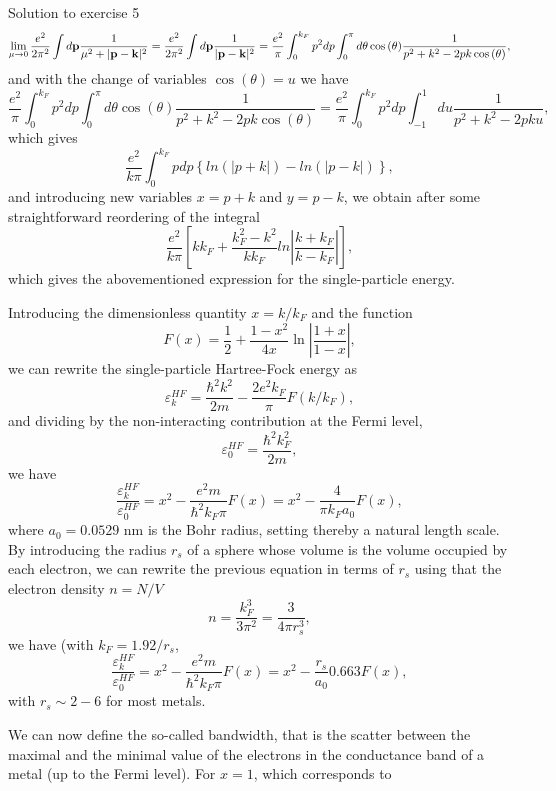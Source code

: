 \documentclass{beamer}
\begin{document}
\begin{frame}
\begin{block}{Solution to exercise 5 }
\[
\lim_{\mu \to 0}\frac{e^{2}}{ 2\pi^2}  \int d{\bf p}\frac{1}{\mu^2+\vert {\bf p}-{\bf k}\vert^2}=\frac{e^{2}}{ 2\pi^2}  \int d{\bf p}\frac{1}{\vert {\bf p}-{\bf k}\vert^2}=\frac{e^{2}}{\pi}  \int_0^{k_F} p^2dp\int_0^{\pi} d\theta\cos{(\theta)}\frac{1}{p^2+k^2-2pk\cos{(\theta)}},
\]
and with the change of variables $\cos{(\theta)}=u$ we have 
\[
\frac{e^{2}}{\pi}  \int_0^{k_F} p^2dp\int_{0}^{\pi} d\theta\cos{(\theta)}\frac{1}{p^2+k^2-2pk\cos{(\theta)}}=\frac{e^{2}}{\pi}  \int_0^{k_F} p^2dp\int_{-1}^{1} du\frac{1}{p^2+k^2-2pku},
\]
which gives
\[
\frac{e^{2}}{k\pi}  \int_0^{k_F} pdp\left\{ln(\vert p+k\vert)-ln(\vert p-k\vert)\right\},
\]
and introducing new variables $x=p+k$ and $y=p-k$, we obtain after some straightforward reordering of the integral
\[
\frac{e^{2}}{k\pi}\left[
kk_F+\frac{k_{F}^{2}-k^{2}}{kk_{F}}ln\left\vert\frac{k+k_{F}}
{k-k_{F}}\right\vert
\right],
\]
which gives the abovementioned expression for the single-particle energy.

Introducing the dimensionless quantity $x=k/k_F$ and the function
\[
F(x) = \frac{1}{2}+\frac{1-x^2}{4x}\ln{\left\vert \frac{1+x}{1-x}\right\vert},
\]
we can rewrite the single-particle Hartree-Fock energy as 
\[
\varepsilon_{k}^{HF}=\frac{\hbar^{2}k^{2}}{2m}-\frac{2e^{2}
k_{F}}{\pi}F(k/k_F),
\]
and dividing by the non-interacting contribution at the Fermi level, 
\[
\varepsilon_{0}^{HF}=\frac{\hbar^{2}k_F^{2}}{2m},
\]
we have
\[
\frac{\varepsilon_{k}^{HF} }{\varepsilon_{0}^{HF}}=x^2-\frac{e^2m}{\hbar^2 k_F\pi}F(x)=x^2-\frac{4}{\pi k_Fa_0}F(x),
\]
where $a_0=0.0529$ nm is the Bohr radius, setting thereby a natural length scale. 
By introducing the radius $r_s$ of a sphere whose volume is the volume occupied by each electron, we can rewrite the previous equation in terms of $r_s$ using that the electron density $n=N/V$
\[
n=\frac{k_F^3}{3\pi^2} = \frac{3}{4\pi r_s^3},
\]
we have (with $k_F=1.92/r_s$,
\[
\frac{\varepsilon_{k}^{HF} }{\varepsilon_{0}^{HF}}=x^2-\frac{e^2m}{\hbar^2 k_F\pi}F(x)=x^2-\frac{r_s}{a_0}0.663F(x),
\]
with $r_s \sim 2-6$ for most metals. 

We can now define the so-called bandwidth, that is the scatter between the maximal and the minimal value of the electrons in the conductance band of a metal (up to the Fermi level). For $x=1$, which corresponds to 



\end{block}
\end{frame}
\end{document}
